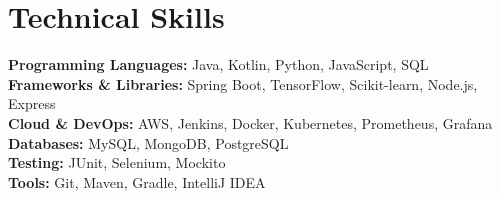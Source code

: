 \documentclass[a4paper]{article}
\begin{document}
\section*{Technical Skills}

\textbf{Programming Languages:} Java, Kotlin, Python, JavaScript, SQL \\
\textbf{Frameworks \& Libraries:} Spring Boot, TensorFlow, Scikit-learn, Node.js, Express \\
\textbf{Cloud \& DevOps:} AWS, Jenkins, Docker, Kubernetes, Prometheus, Grafana \\
\textbf{Databases:} MySQL, MongoDB, PostgreSQL \\
\textbf{Testing:} JUnit, Selenium, Mockito \\
\textbf{Tools:} Git, Maven, Gradle, IntelliJ IDEA
\end{document}
